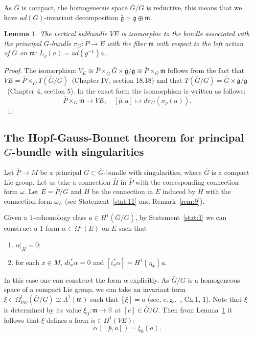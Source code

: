 \documentclass[12pt,letterpaper]{amsart}
\theoremstyle{definition}
\theoremstyle{plain}
\newtheorem{lm}{Lemma}
\theoremstyle{remark}
\begin{document}
As $\bar{G}$ is compact, the homogeneous space $\bar{G}/G$ is reductive, this means that we have $ad(G)$-invariant decomposition $\bar{\mathfrak{g}} = \mathfrak{g} \oplus \mathfrak{m}$.
\begin{lm}
The vertical subbundle $VE$ is isomorphic to the bundle associated with the principal $G$-bundle $\pi_G : \bar{P} \to E$ with the fiber $\mathfrak{m}$ with respect to the left action of $G$ on $\mathfrak{m}$: $L_g (a) = ad(g^{-1}) a$.
\label{lm:4}
\end{lm}
\begin{proof}
The isomorphism $V_E \cong \bar{P}\times_{\bar{G}} \bar{G} \times \bar{\mathfrak{g}}/\mathfrak{g} \cong \bar{P}\times_G \mathfrak{m}$ follows from the fact that $VE=\bar{P}\times_{\bar{G}} T(\bar{G}/G)$~\cite{michor2000}(Chapter IV, section 18.18)
and that $T(\bar{G}/G)=\bar{G}\times \bar {\mathfrak{g}} / \mathfrak{g}$~\cite{sharpe2000}(Chapter 4, section 5).
In the exact form the isomorphism is written as follows:
\begin{equation}
\bar{P}\times_G \mathfrak{m} \to VE, \quad [\bar{p}, a] \mapsto d\pi_G(\sigma_{\bar{p}} (a)).
\label{eq:79}
\end{equation}
\end{proof}

\subsection{The Hopf-Gauss-Bonnet theorem for principal $G$-bundle with singularities}
\label{subsec:5_2}
Let $\bar{P} \to M$ be a principal $G \subset \bar{G}$-bundle with singularities, where $\bar{G}$ is a compact Lie group.
Let us take a connection $\bar{H}$ in $\bar{P}$ with the corresponding connection form $\omega$.
Let $E = \bar{P}/G$ and $H$ be the connection in $E$ induced by $\bar{H}$ with the connection form $\omega_E$ (see Statement~\ref{stat:11} and Remark~\ref{rem:9}). 

Given a $1$-cohomology class $a \in H^{1}(\bar{G}/G)$, by Statement~\ref{stat:1} we can construct a $1$-form $\alpha \in \Omega^{1}(E)$ on $E$ such that
\begin{enumerate}
\item
$\left.\alpha\right|_H = 0$;
\item
for each $x \in M$, $d i_x^* \alpha = 0$ and $[ i_x^* \alpha ] = H^1(\eta_x) a$.
\end{enumerate}

In this case one can construct the form $\alpha$ explicitly.
As $\bar{G}/G$ is a homogeneous space of a compact Lie group, we can take an invariant form $\xi \in \Omega^1_{inv}(\bar{G}/G) \cong \Lambda^1(\mathfrak{m})$ such that $[\xi] = a$ (see, e.\,g.,~\cite{dubrovin_novikov_fomenko1990}, Ch.1, 1).
Note that $\xi$ is determined by its value $\xi_0 : \mathfrak{m} \to \mathbb{R}$ at $[e] \in \bar{G}/G$.
Then from Lemma~\ref{lm:4} it follows that $\xi$ defines a form $\widetilde{\alpha} \in \Omega^1(VE)$:
\begin{equation}
\widetilde{\alpha}([\bar{p}, a]) = \xi_0(a).
\label{eq:80}
\end{equation}
\end{document}
